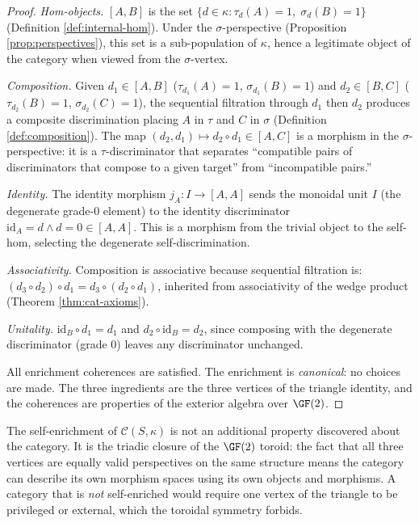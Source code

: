 \begin{proof}
\emph{Hom-objects.}
$[A,B]$ is the set $\{d \in \kappa : \tau_d(A) = 1,\;
\sigma_d(B) = 1\}$ (Definition \ref{def:internal-hom}).
Under the $\sigma$-perspective (Proposition
\ref{prop:perspectives}), this set is a sub-population of
$\kappa$, hence a legitimate object of the category when
viewed from the $\sigma$-vertex.

\emph{Composition.}
Given $d_1 \in [A,B]$ ($\tau_{d_1}(A) = 1$,
$\sigma_{d_1}(B) = 1$) and $d_2 \in [B,C]$
($\tau_{d_2}(B) = 1$, $\sigma_{d_2}(C) = 1$), the
sequential filtration through $d_1$ then $d_2$ produces
a composite discrimination placing $A$ in $\tau$ and $C$
in $\sigma$ (Definition \ref{def:composition}). The map
$(d_2, d_1) \mapsto d_2 \circ d_1 \in [A,C]$ is a
morphism in the $\sigma$-perspective: it is a
$\tau$-discriminator that separates ``compatible pairs of
discriminators that compose to a given target'' from
``incompatible pairs.''

\emph{Identity.}
The identity morphism $j_A: I \to [A,A]$ sends the
monoidal unit $I$ (the degenerate grade-0 element) to
the identity discriminator $\mathrm{id}_A = d \wedge d = 0
\in [A,A]$. This is a morphism from the trivial object
to the self-hom, selecting the degenerate self-discrimination.

\emph{Associativity.}
Composition is associative because sequential filtration is:
$(d_3 \circ d_2) \circ d_1 = d_3 \circ (d_2 \circ d_1)$,
inherited from associativity of the wedge product
(Theorem \ref{thm:cat-axioms}).

\emph{Unitality.}
$\mathrm{id}_B \circ d_1 = d_1$ and $d_2 \circ \mathrm{id}_B
= d_2$, since composing with the degenerate discriminator
(grade 0) leaves any discriminator unchanged.

All enrichment coherences are satisfied. The enrichment is
\emph{canonical}: no choices are made. The three ingredients
are the three vertices of the triangle identity, and the
coherences are properties of the exterior algebra over
$\GF(2)$.
\end{proof}

\begin{remark}
The self-enrichment of $\mathcal{C}(S,\kappa)$ is not an
additional property discovered about the category. It is
the triadic closure of the $\GF(2)$ toroid: the fact that
all three vertices are equally valid perspectives on the
same structure means the category can describe its own
morphism spaces using its own objects and morphisms. A
category that is \emph{not} self-enriched would require one
vertex of the triangle to be privileged or external, which
the toroidal symmetry forbids.
\end{remark}

